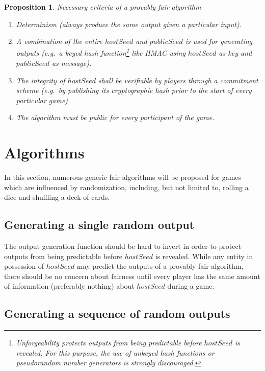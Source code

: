 \documentclass[a4paper]{article}
\newtheorem{proposition}[algorithm]{Proposition}
\theoremstyle{definition}
\theoremstyle{remark}
\begin{document}
\begin{proposition}{Necessary criteria of a provably fair algorithm}
\begin{enumerate}[label=(\roman*)]
\item Determinism (always produce the same output given a particular input).

\item A combination of the entire \(hostSeed\) and \(publicSeed\) is used for generating outputs (e.g.\ a keyed hash function\footnote{Unforgeability protects outputs from being predictable before \(hostSeed\) is revealed. For this purpose, the use of unkeyed hash functions or pseudorandom number generators is strongly discouraged.} like HMAC using \(hostSeed\) as key and \(publicSeed\) as message).

\item The integrity of \(hostSeed\) shall be verifiable by players through a commitment scheme (e.g.\ by publishing its cryptographic hash prior to the start of every particular game).

\item The algorithm must be public for every participant of the game.
\end{enumerate}
\end{proposition}

\section{Algorithms}
In this section, numerous generic fair algorithms will be proposed for games which are influenced by randomization, including, but not limited to, rolling a dice and shuffling a deck of cards.

\subsection{Generating a single random output}
The output generation function should be hard to invert \cite[pp.~30--35]{goldreich2007} in order to protect outputs from being predictable before \(hostSeed\) is revealed. While any entity in possession of \(hostSeed\) may predict the outputs of a provably fair algorithm, there should be no concern about fairness until every player has the same amount of information (preferably nothing) about \(hostSeed\) during a game.

\subsection{Generating a sequence of random outputs}
\end{document}
